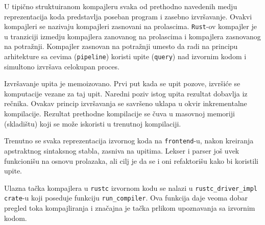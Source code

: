 U tipično struktuiranom kompajleru svaka od prethodno navedenih medju reprezentacija koda predstavlja 
poseban program i zasebno izvršavanje. Ovakvi kompajleri se nazivaju 
kompajleri zasnovani na prolascima. \verb|Rust|-ov kompajler je u tranziciji izmedju 
kompajlera zanovanog na prolascima i kompajlera zasnovanog na potražnji. Kompajler 
zasnovan na potražnji umesto da radi na principu arhitekture sa cevima (\verb|pipeline|)
koristi upite (\verb|query|) nad izvornim kodom i simultono izvršava celokupan proces.

Izvršavanje upita je memoizovano. Prvi put kada se upit pozove, izvršiće se komputacije 
vezane za taj upit. Naredni poziv istog upita rezultat dobavlja iz rečnika.
Ovakav princip izvršavanja se savršeno uklapa u okvir inkrementalne kompilacije. 
Rezultat prethodne kompilacije se čuva u masovnoj memoriji (skladištu) koji se može iskoristi
u trenutnoj kompilaciji.

Trenutno se svaka reprezentacija izvornog koda na \verb|frontend|-u, 
nakon kreiranja apstraktnog sintaksnog stabla, zasniva na upitima. 
Lekser i parser još uvek funkcionišu na osnovu prolazaka, 
ali cilj je da se i oni refaktorišu kako bi koristili upite.

Ulazna tačka kompajlera u \verb|rustc| izvornom kodu se nalazi u \verb|rustc_driver_impl| \verb|crate|-u
koji poseduje funkciju \verb|run_compiler|. Ova funkcija daje veoma dobar pregled toka kompajliranja 
i značajna je tačka prlikom upoznavanja sa izvornim kodom. 